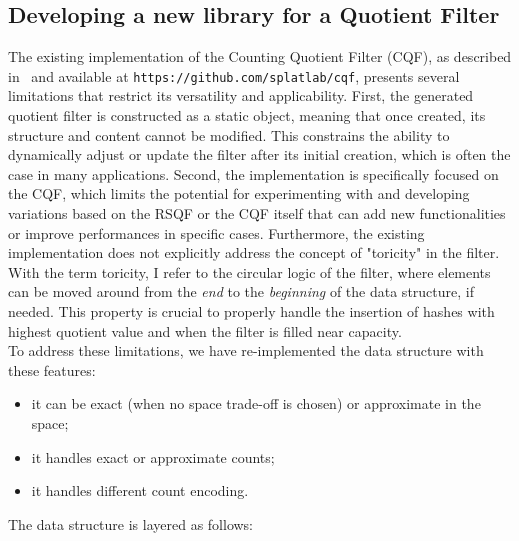 \subsection{Developing a new library for a Quotient Filter}
The existing implementation of the Counting Quotient Filter (CQF), as described in~\cite{cqf} and available at \texttt{https://github.com/splatlab/cqf}, presents several limitations that restrict its versatility and applicability. First, the generated quotient filter is constructed as a static object, meaning that once created, its structure and content cannot be modified. This constrains the ability to dynamically adjust or update the filter after its initial creation, which is often the case in many applications.
Second, the implementation is specifically focused on the CQF, which limits the potential for experimenting with and developing variations based on the RSQF or the CQF itself that can add new functionalities or improve performances in specific cases. Furthermore, the existing implementation does not explicitly address the concept of "toricity" in the filter. With the term toricity, I refer to the circular logic of the filter, where elements can be moved around from the \emph{end} to the \emph{beginning} of the data structure, if needed. This property is crucial to properly handle the insertion of hashes with highest quotient value and when the filter is filled near capacity.\\
To address these limitations, we have re-implemented the data structure with these features:
\begin{itemize}
	\item it can be exact (when no space trade-off is chosen) or approximate in the \kmer space;
	\item it handles exact or approximate counts;
	\item it handles different count encoding.
\end{itemize}
The data structure is layered as follows:
